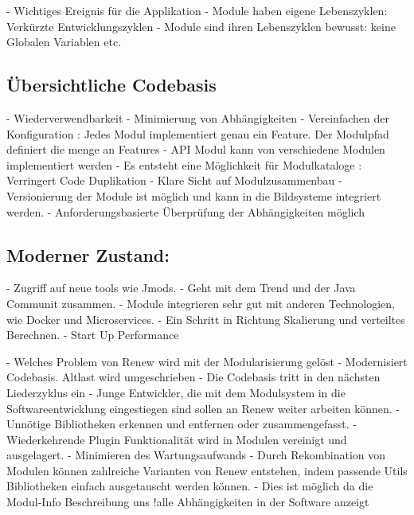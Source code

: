	- Wichtiges Ereignis für die Applikation
	- Module haben eigene Lebenszyklen: Verkürzte Entwicklungszyklen  
	- Module sind ihren Lebenszyklen bewusst: keine Globalen Variablen etc.

\subsection{Übersichtliche Codebasis}\label{sub:übersichtliche_codebasis}
	- Wiederverwendbarkeit 
	- Minimierung von Abhängigkeiten 
	- Vereinfachen der Konfiguration : Jedes Modul implementiert genau ein Feature. Der Modulpfad definiert die menge an Features 
	- API Modul kann von verschiedene Modulen implementiert werden
	- Es entsteht eine Möglichkeit für Modulkataloge : Verringert Code Duplikation
	- Klare Sicht auf Modulzusammenbau  
	- Versionierung der Module ist möglich und kann in die Bildsysteme integriert werden. 
	- Anforderungsbasierte Überprüfung der Abhängigkeiten möglich 

\subsection{Moderner Zustand:} \label{sub:moderner_zustand_}
	- Zugriff auf neue tools wie Jmods.
	- Geht mit dem Trend und der Java Communit zusammen. 
	- Module integrieren sehr gut mit anderen Technologien, wie Docker und Microservices.
	- Ein Schritt in Richtung Skalierung und verteiltes Berechnen. 
	- Start Up Performance 



	- Welches Problem von Renew wird mit der Modularisierung gelöst 
		- Modernisiert Codebasis. Altlast wird umgeschrieben
		- Die Codebasis tritt in den nächsten Liederzyklus ein
		- Junge Entwickler, die mit dem Modulsystem in die Softwareentwicklung eingestiegen sind sollen an Renew weiter arbeiten können. 
		- Unnötige Bibliotheken erkennen und entfernen oder zusammengefasst.
		- Wiederkehrende Plugin Funktionalität wird in Modulen vereinigt und ausgelagert.
		- Minimieren des Wartungsaufwands 
		- Durch Rekombination von Modulen können zahlreiche Varianten von Renew entstehen, indem passende Utils Bibliotheken einfach ausgetauscht werden können. 
		-  Dies ist möglich da die Modul-Info Beschreibung uns !alle Abhängigkeiten in der Software anzeigt 




